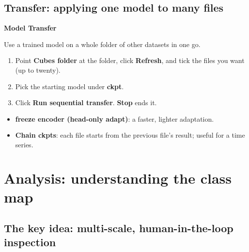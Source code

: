 \documentclass[11pt]{article}
\newcommand{\btn}[1]{\textbf{#1}}
\newcommand{\tab}[1]{\textsf{\textbf{#1}}}
\begin{document}
\subsection{Transfer: applying one model to many files}
\tab{Model \textrightarrow{} Transfer}

Use a trained model on a whole folder of other datasets in one go.
\begin{enumerate}[itemsep=2pt]
\item Point \textbf{Cubes folder} at the folder, click \btn{Refresh}, and tick the
files you want (up to twenty).
\item Pick the starting model under \textbf{ckpt}.
\item Click \btn{Run sequential transfer}. \btn{Stop} ends it.
\end{enumerate}
\begin{itemize}[itemsep=2pt]
\item \textbf{freeze encoder (head-only adapt)}: a faster, lighter adaptation.
\item \textbf{Chain ckpts}: each file starts from the previous file's result;
useful for a time series.
\end{itemize}

\section{Analysis: understanding the class map}
\subsection{The key idea: multi-scale, human-in-the-loop inspection}
\end{document}
